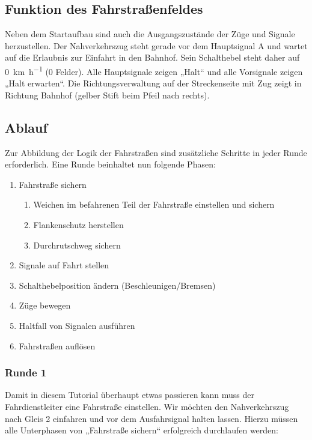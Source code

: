 \subsection*{Funktion des Fahrstraßenfeldes}

\setup

  Neben dem Startaufbau sind auch die Ausgangszustände der Züge und Signale herzustellen. Der Nahverkehrszug steht gerade vor dem Hauptsignal A und wartet auf die Erlaubnis zur Einfahrt in den Bahnhof. Sein Schalthebel steht daher auf \SI{0}{\kilo\metre\per\hour} (0 Felder). Alle Hauptsignale zeigen „Halt“ und alle Vorsignale zeigen „Halt erwarten“. Die Richtungsverwaltung auf der Streckenseite mit Zug zeigt in Richtung Bahnhof (gelber Stift beim Pfeil nach rechts).

\subsection*{Ablauf}
  Zur Abbildung der Logik der Fahrstraßen sind zusätzliche Schritte in jeder Runde erforderlich. Eine Runde beinhaltet nun folgende Phasen:
  \begin{enumerate}
    \item Fahrstraße sichern
      \begin{enumerate}[label=\alph*)]
        \item Weichen im befahrenen Teil der Fahrstraße einstellen und sichern
        \item Flankenschutz herstellen
        \item Durchrutschweg sichern
      \end{enumerate}
    \item Signale auf Fahrt stellen
    \item Schalthebelposition ändern (Beschleunigen/Bremsen)
    \item Züge bewegen
    \item Haltfall von Signalen ausführen
    \item Fahrstraßen auflösen
  \end{enumerate}

\subsubsection*{Runde 1}
  Damit in diesem Tutorial überhaupt etwas passieren kann muss der Fahrdienstleiter eine Fahrstraße einstellen. Wir möchten den Nahverkehrszug nach Gleis 2 einfahren und vor dem Ausfahrsignal halten lassen. Hierzu müssen alle Unterphasen von „Fahrstraße sichern“ erfolgreich durchlaufen werden:


